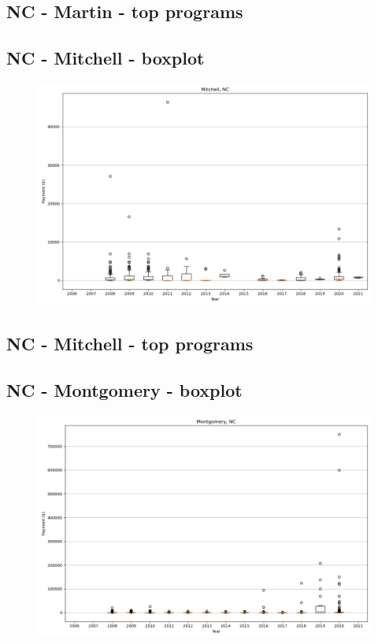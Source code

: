 \subsection*{NC - Martin - top programs}

\newpage
\subsection*{NC - Mitchell - boxplot}
\begin{figure}[h]
\centering
\includegraphics[width=7in]{../output/boxplots/counties/Mitchell-NC_boxplot.png}
\end{figure}


\subsection*{NC - Mitchell - top programs}

\newpage
\subsection*{NC - Montgomery - boxplot}
\begin{figure}[h]
\centering
\includegraphics[width=7in]{../output/boxplots/counties/Montgomery-NC_boxplot.png}
\end{figure}


